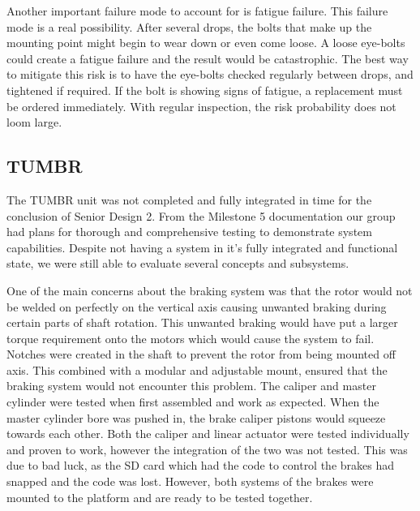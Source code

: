 Another important failure mode to account for is fatigue failure. This failure mode is a real possibility. After several drops, the bolts that make up the mounting point might begin to wear down or even come loose. A loose eye-bolts could create a fatigue failure and the result would be catastrophic. The best way to mitigate this risk is to have the eye-bolts checked regularly between drops, and tightened if required. If the bolt is showing signs of fatigue, a replacement must be ordered immediately. With regular inspection, the risk probability does not loom large. 


\subsection{TUMBR}

\indent\indent The TUMBR unit was not completed and fully integrated in time for the conclusion of Senior Design 2. From the Milestone 5 documentation our group had plans for thorough and comprehensive testing to demonstrate system capabilities. Despite not having a system in it's fully integrated and functional state, we were still able to evaluate several concepts and subsystems.


One of the main concerns about the braking system was that the rotor would not be welded on perfectly on the vertical axis causing unwanted braking during certain parts of shaft rotation. This unwanted braking would have put a larger torque requirement onto the motors which would cause the system to fail. Notches were created in the shaft to prevent the rotor from being mounted off axis. This combined with a modular and adjustable mount, ensured that the braking system would not encounter this problem. The caliper and master cylinder were tested when first assembled and work as expected. When the master cylinder bore was pushed in, the brake caliper pistons would squeeze towards each other. Both the caliper and linear actuator were tested individually and proven to work, however the integration of the two was not tested. This was due to bad luck, as the SD card which had the code to control the brakes had snapped and the code was lost. However, both systems of the brakes were mounted to the platform and are ready to be tested together. 

